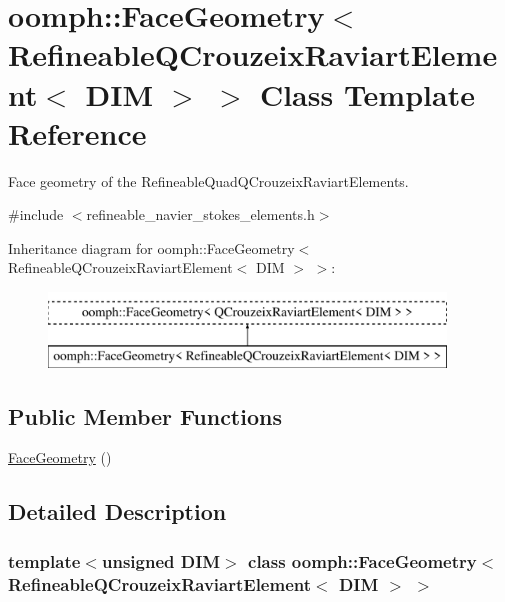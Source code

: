 \hypertarget{classoomph_1_1FaceGeometry_3_01RefineableQCrouzeixRaviartElement_3_01DIM_01_4_01_4}{}\section{oomph\+:\+:Face\+Geometry$<$ Refineable\+Q\+Crouzeix\+Raviart\+Element$<$ D\+IM $>$ $>$ Class Template Reference}
\label{classoomph_1_1FaceGeometry_3_01RefineableQCrouzeixRaviartElement_3_01DIM_01_4_01_4}


Face geometry of the Refineable\+Quad\+Q\+Crouzeix\+Raviart\+Elements.  




{\ttfamily \#include $<$refineable\+\_\+navier\+\_\+stokes\+\_\+elements.\+h$>$}

Inheritance diagram for oomph\+:\+:Face\+Geometry$<$ Refineable\+Q\+Crouzeix\+Raviart\+Element$<$ D\+IM $>$ $>$\+:\begin{figure}[H]
\begin{center}
\leavevmode
\includegraphics[height=2.000000cm]{classoomph_1_1FaceGeometry_3_01RefineableQCrouzeixRaviartElement_3_01DIM_01_4_01_4}
\end{center}
\end{figure}
\subsection*{Public Member Functions}
\begin{DoxyCompactItemize}
\item 
\hyperlink{classoomph_1_1FaceGeometry_3_01RefineableQCrouzeixRaviartElement_3_01DIM_01_4_01_4_a75b7fc818a28c9d22a5a84461179dfd5}{Face\+Geometry} ()
\end{DoxyCompactItemize}


\subsection{Detailed Description}
\subsubsection*{template$<$unsigned D\+IM$>$\newline
class oomph\+::\+Face\+Geometry$<$ Refineable\+Q\+Crouzeix\+Raviart\+Element$<$ D\+I\+M $>$ $>$}

